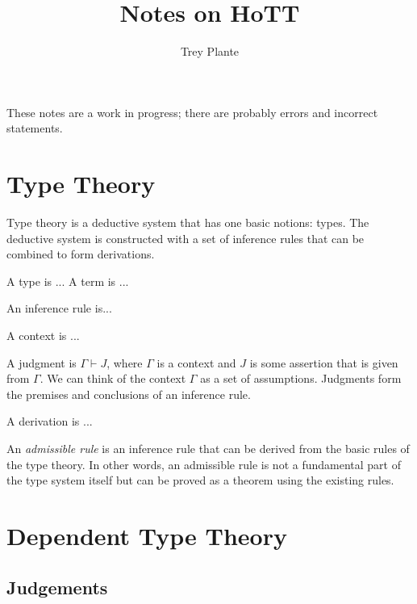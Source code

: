 \documentclass{article}
\title{Notes on HoTT}
\author{Trey Plante}
\begin{document}
\maketitle
These notes are a work in progress; there are probably errors and incorrect statements.

\section{Type Theory}

Type theory is a deductive system that has one basic notions: types. The deductive system is constructed with a set of inference rules that can be combined to form derivations.

\begin{definition}
  A type is ... A term is ...
\end{definition}

\begin{definition}
  An inference rule is...
\end{definition}

\begin{definition}
  A context is ...
\end{definition}

\begin{definition}\label{dfn: judgment}
  A judgment is $\Gamma \vdash J$, where $\Gamma$ is a context and $J$ is some assertion that is given from $\Gamma$. We can think of the context $\Gamma$ as a set of assumptions.
  Judgments form the premises and conclusions of an inference rule.
\end{definition}

\begin{definition}
  A derivation is ...
\end{definition}

\begin{definition}
  An \emph{admissible rule} is an inference rule that can be derived from the basic rules of the type theory. In other words, an admissible rule is not a fundamental part of the type system itself but can be proved as a theorem using the existing rules.
\end{definition}

\section{Dependent Type Theory}

\subsection{Judgements}
\end{document}
